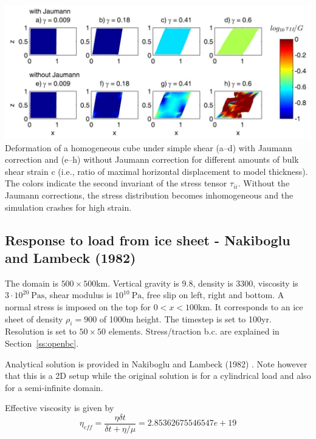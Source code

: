 \begin{center}
\includegraphics[width=15cm]{images/viscoelasticity/vosc15b}\\
{\captionfont Deformation of a homogeneous cube under simple shear (a–d) with 
Jaumann correction and (e–h) without Jaumann correction for different amounts of bulk shear strain c
(i.e., ratio of maximal horizontal displacement to model thickness). The colors indicate 
the second invariant of the stress tensor $\tau_{ii}$. Without the Jaumann corrections, the stress 
distribution becomes inhomogeneous and the simulation crashes for high strain.}
\end{center}





\subsection{Response to load from ice sheet - Nakiboglu and Lambeck (1982)}

The domain is $500\times500$km. Vertical gravity is 9.8, density is 3300, viscosity 
is $3\cdot10^{20}~\si{\pascal\second}$, 
shear modulus is $10^{10}~\si{\pascal}$, free slip on left, right and bottom. 
A normal stress is imposed on the top for $0<x<100$km. It corresponds to  
an ice sheet of density $\rho_i=900$ of 1000m height. 
The timestep is set to 100yr. Resolution is set to $50\times50$ elements.
Stress/traction b.c. are explained in Section~\ref{ss:openbc}.

Analytical solution is provided in Nakiboglu and Lambeck (1982) \cite{nala82}. 
Note however that this is a 2D setup while the original solution is for a 
cylindrical load and also for a semi-infinite domain.

Effective viscosity is given by
\[
\eta_{eff} = \frac{\eta \delta t}{\delta t + \eta/\mu}
= 2.85362675546547e+19
\]


